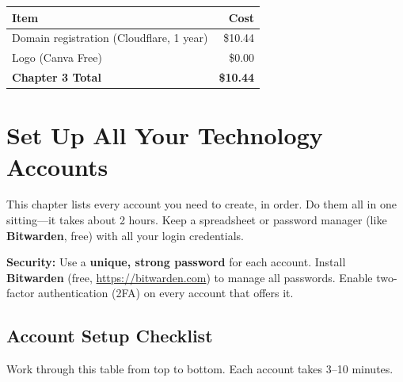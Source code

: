 \documentclass[12pt, letterpaper, oneside]{book}
\begin{document}
\begin{table}[H]
\centering
\begin{tabular}{lr}
\toprule
\textbf{Item} & \textbf{Cost} \\
\midrule
Domain registration (Cloudflare, 1 year) & \$10.44 \\
Logo (Canva Free) & \$0.00 \\
\midrule
\textbf{Chapter 3 Total} & \textbf{\$10.44} \\
\bottomrule
\end{tabular}
\end{table}

\chapter{Set Up All Your Technology Accounts}

This chapter lists every account you need to create, in order. Do them all in one sitting---it takes about 2 hours. Keep a spreadsheet or password manager (like \textbf{Bitwarden}, free) with all your login credentials.

\begin{warningbox}
\textbf{Security:} Use a \textbf{unique, strong password} for each account. Install \textbf{Bitwarden} (free, \url{https://bitwarden.com}) to manage all passwords. Enable two-factor authentication (2FA) on every account that offers it.
\end{warningbox}

\section{Account Setup Checklist}

Work through this table from top to bottom. Each account takes 3--10 minutes.
\end{document}
